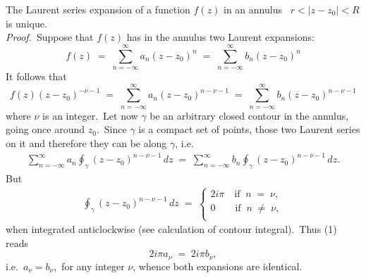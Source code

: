 \documentclass[12pt]{article}
\theoremstyle{definition}
\begin{document}
 

The Laurent series expansion of a function $f(z)$ in an annulus \, $r < |z\!-\!z_0| < R$\, is unique.\\

\emph{Proof.}\, Suppose that $f(z)$ has in the annulus two Laurent expansions:
$$f(z) \;=\; \sum_{n=-\infty}^\infty\!a_n(z\!-\!z_0)^n 
       \;=\; \sum_{n=-\infty}^\infty\!b_n(z\!-\!z_0)^n$$
It follows that
$$f(z)(z\!-\!z_0)^{-\nu-1}\;=\; \sum_{n=-\infty}^\infty\!a_n(z\!-\!z_0)^{n-\nu-1} 
                          \;=\; \sum_{n=-\infty}^\infty\!b_n(z\!-\!z_0)^{n-\nu-1}$$
where $\nu$ is an integer.\, Let now $\gamma$ be an arbitrary closed contour in the annulus, going once around $z_0$.\, Since $\gamma$ is a compact set of points, those two Laurent series  on it and therefore they can be  along $\gamma$, i.e.
\begin{align}
\sum_{n=-\infty}^\infty\!a_n\oint_\gamma(z\!-\!z_0)^{n-\nu-1}\,dz \;=\; 
\sum_{n=-\infty}^\infty\!b_n\oint_\gamma(z\!-\!z_0)^{n-\nu-1}\,dz.
\end{align}
But
\begin{align*}
 \oint_\gamma(z\!-\!z_0)^{n-\nu-1}\,dz \;=\;
   \begin{cases}
     2i\pi \quad \mbox{if} \;\; n \;=\; \nu, \\
     0    \qquad \mbox{if} \;\; n \;\neq\; \nu, \\
   \end{cases}
\end{align*}
when integrated anticlockwise (see calculation of contour integral).\, Thus (1) reads 
$$2i\pi a_\nu \;=\; 2i\pi b_\nu,$$
i.e.\, $a_\nu = b_\nu$,\, for any integer $\nu$, whence both expansions are identical.


\end{document}
